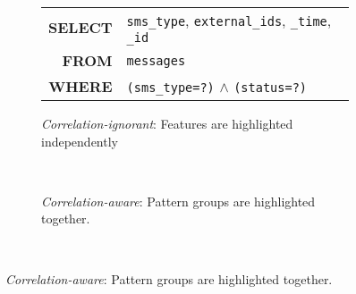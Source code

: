 \begin{figure}
 \centering
\begin{subfigure}{\columnwidth}
  {\small
    \begin{tabular}{rp{60mm}}
    \textbf{SELECT} & 
        \texttt{sms\_type},
        \textcolor{light-gray}{\texttt{external\_ids}},
        \texttt{\_time},
        \texttt{\_id}\\ 
    \textbf{FROM} &
        \texttt{messages}\\ 
    \textbf{WHERE} &
        \textcolor{mid-gray} {\texttt{(sms\_type=?)}} $\wedge$
        \texttt{(status=?)}   
    \end{tabular}
  }
  \caption{\textit{Correlation-ignorant}: Features are highlighted independently}
  \label{fig:screenshots:nocorrelation}
\end{subfigure}\\[2mm]
\begin{subfigure}{\columnwidth}
  {\centering
  }
  \caption{\textit{Correlation-aware}: Pattern groups are highlighted together.
  }
  \label{fig:screenshots:correlation}  
\end{subfigure}\\[2mm]
\label{fig:screenshots}
\trimfigurewhitespace
\end{figure} 


